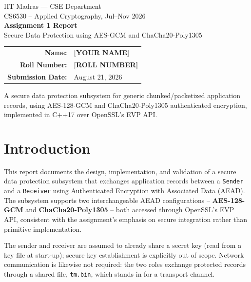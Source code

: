 \documentclass[11pt]{article}
\newcommand{\StudentName}{\textbf{[YOUR NAME]}}
\newcommand{\RollNumber}{\textbf{[ROLL NUMBER]}}
\newcommand{\SubmissionDate}{August 21, 2026}
\begin{document}
\begin{titlepage}
\centering
\vspace*{1.5cm}
{\Large IIT Madras --- CSE Department}\\[0.3cm]
{\large CS6530 -- Applied Cryptography, Jul--Nov 2026}\\[1.5cm]

{\huge\bfseries Assignment 1 Report}\\[0.6cm]
{\Large Secure Data Protection using AES-GCM and ChaCha20-Poly1305}\\[2cm]

\begin{tabular}{rl}
\textbf{Name:} & \StudentName \\
\textbf{Roll Number:} & \RollNumber \\
\textbf{Submission Date:} & \SubmissionDate \\
\end{tabular}

\vfill
{\small A secure data protection subsystem for generic chunked/packetized application
records, using AES-128-GCM and ChaCha20-Poly1305 authenticated encryption, implemented
in C++17 over OpenSSL's EVP API.}
\end{titlepage}

\tableofcontents
\newpage

\section{Introduction}

This report documents the design, implementation, and validation of a secure data
protection subsystem that exchanges application records between a \texttt{Sender} and
a \texttt{Receiver} using Authenticated Encryption with Associated Data (AEAD). The
subsystem supports two interchangeable AEAD configurations -- \textbf{AES-128-GCM} and
\textbf{ChaCha20-Poly1305} -- both accessed through OpenSSL's EVP API, consistent with
the assignment's emphasis on secure integration rather than primitive implementation.

The sender and receiver are assumed to already share a secret key (read from a key
file at start-up); secure key establishment is explicitly out of scope. Network
communication is likewise not required: the two roles exchange protected records
through a shared file, \texttt{tm.bin}, which stands in for a transport channel.
\end{document}
